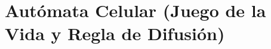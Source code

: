 \section{Autómata Celular (Juego de la Vida y Regla de Difusión)}

\newpage

\newpage

\newpage

\newpage

